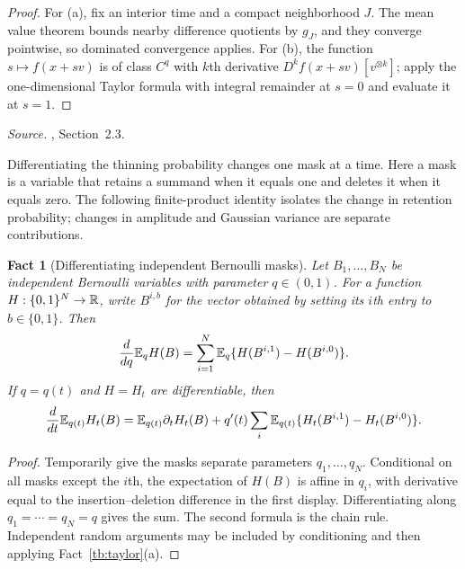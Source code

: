 \documentclass[11pt,letterpaper]{article}
\theoremstyle{plain}
\newtheorem{fact}{Fact}[section]
\begin{document}
\begin{proof}
For (a), fix an interior time and a compact neighborhood \(J\).
The mean value theorem bounds nearby difference quotients by \(g_J\),
and they converge pointwise, so dominated convergence applies. For (b),
the function \(s\mapsto f(x+sv)\) is of class \(C^q\) with \(k\)th derivative
\(D^kf(x+sv)[v^{\otimes k}]\); apply the one-dimensional Taylor formula with
integral remainder at \(s=0\) and evaluate it at \(s=1\).
\end{proof}

\emph{Source.} , Section~2.3.

Differentiating the thinning probability changes one mask at a time.
Here a mask is a variable that retains a summand when it equals one
and deletes it when it equals zero. The following finite-product identity
isolates the change in retention probability; changes in amplitude and
Gaussian variance are separate contributions.

\begin{fact}[Differentiating independent Bernoulli masks]\label{tb:bernoulli}
Let \(B_1,\ldots,B_N\) be independent Bernoulli variables with parameter
\(q\in(0,1)\). For a function \(H:\{0,1\}^N\to\mathbb R\), write
\(B^{i,b}\) for the vector obtained by setting its \(i\)th entry to
\(b\in\{0,1\}\). Then
\[
 \frac{d}{dq}\mathbb E_q H(B)
 =\sum_{i=1}^N\mathbb E_q\{H(B^{i,1})-H(B^{i,0})\}.
\]
If \(q=q(t)\) and \(H=H_t\) are differentiable, then
\[
 \frac{d}{dt}\mathbb E_{q(t)}H_t(B)
 =\mathbb E_{q(t)}\partial_t H_t(B)
 +q'(t)\sum_i\mathbb E_{q(t)}
       \{H_t(B^{i,1})-H_t(B^{i,0})\}.
\]
\end{fact}

\begin{proof}
Temporarily give the masks separate parameters \(q_1,\ldots,q_N\).
Conditional on all masks except the \(i\)th, the expectation of \(H(B)\)
is affine in \(q_i\), with derivative equal to the insertion--deletion
difference in the first display. Differentiating along
\(q_1=\cdots=q_N=q\) gives the sum. The second formula is the chain
rule. Independent random arguments may be included by conditioning
and then applying Fact~\ref{tb:taylor}(a).
\end{proof}

\end{document}
